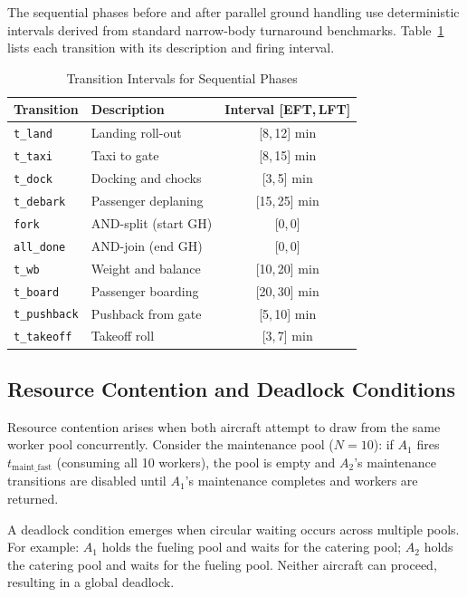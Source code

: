 \documentclass[conference,a4paper]{IEEEtran}
\begin{document}
The sequential phases before and after parallel ground handling use
deterministic intervals derived from standard narrow-body turnaround
benchmarks. Table~\ref{tab:timing} lists each transition with its
description and firing interval.

\begin{table}[htbp]
\caption{Transition Intervals for Sequential Phases}
\label{tab:timing}
\centering
\begin{tabular}{@{}llc@{}}
\toprule
\textbf{Transition} & \textbf{Description} & \textbf{Interval [EFT,\,LFT]} \\
\midrule
\texttt{t\_land}     & Landing roll-out           & [8,\,12] min  \\
\texttt{t\_taxi}     & Taxi to gate               & [8,\,15] min  \\
\texttt{t\_dock}     & Docking and chocks         & [3,\,5] min   \\
\texttt{t\_debark}   & Passenger deplaning        & [15,\,25] min \\
\texttt{fork}        & AND-split (start GH)       & [0,\,0]       \\
\texttt{all\_done}   & AND-join (end GH)          & [0,\,0]       \\
\texttt{t\_wb}       & Weight and balance         & [10,\,20] min \\
\texttt{t\_board}    & Passenger boarding         & [20,\,30] min \\
\texttt{t\_pushback} & Pushback from gate         & [5,\,10] min  \\
\texttt{t\_takeoff}  & Takeoff roll               & [3,\,7] min   \\
\bottomrule
\end{tabular}
\end{table}

\subsection{Resource Contention and Deadlock Conditions}

Resource contention arises when both aircraft attempt to draw from the same
worker pool concurrently. Consider the maintenance pool ($N = 10$): if $A_1$
fires $t_{\mathrm{maint\_fast}}$ (consuming all 10 workers), the pool is
empty and $A_2$'s maintenance transitions are disabled until $A_1$'s
maintenance completes and workers are returned.

A deadlock condition emerges when circular waiting occurs across multiple
pools. For example: $A_1$ holds the fueling pool and waits for the catering
pool; $A_2$ holds the catering pool and waits for the fueling pool. Neither
aircraft can proceed, resulting in a global deadlock.
\end{document}
